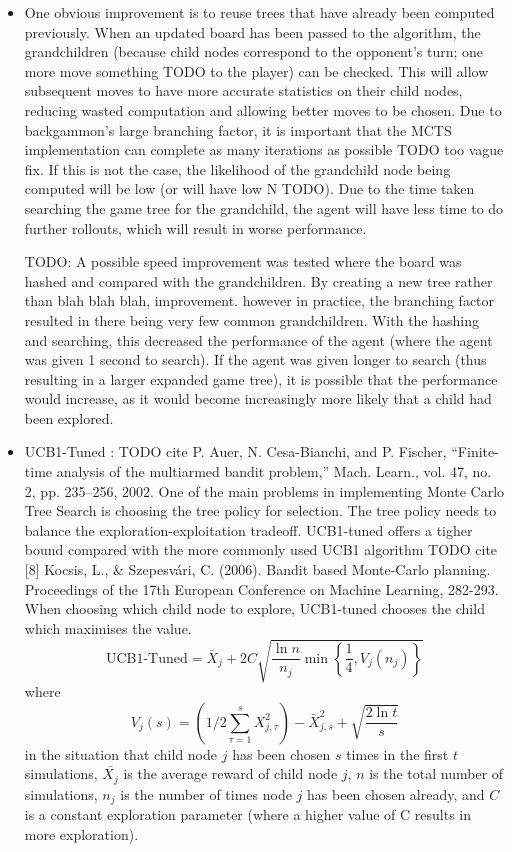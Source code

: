 \begin{itemize}
    \item One obvious improvement is to reuse trees that have already been computed previously. When an updated board has been passed to the algorithm, the grandchildren (because child nodes correspond to the opponent's turn; one more move something TODO to the player) can be checked. This will allow subsequent moves to have more accurate statistics on their child nodes, reducing wasted computation and allowing better moves to be chosen. Due to backgammon's large branching factor, it is important that the MCTS implementation can complete as many iterations as possible TODO too vague fix. If this is not the case, the likelihood of the grandchild node being computed will be low (or will have low N TODO). Due to the time taken searching the game tree for the grandchild, the agent will have less time to do further rollouts, which will result in worse performance.  

    TODO: A possible speed improvement was tested where the board was hashed and compared with the grandchildren. By creating a new tree rather than blah blah blah, improvement. however in practice, the branching factor resulted in there being very few common grandchildren. With the hashing and searching, this decreased the performance of the agent (where the agent was given 1 second to search). If the agent was given longer to search (thus resulting in a larger expanded game tree), it is possible that the performance would increase, as it would become increasingly more likely that a child had been explored.
    
    \item UCB1-Tuned \cite{6145622}: TODO cite  P. Auer, N. Cesa-Bianchi, and P. Fischer, “Finite-time analysis of the
    multiarmed bandit problem,” Mach. Learn., vol. 47, no. 2, pp. 235–256, 2002. One of the main problems in implementing Monte Carlo Tree Search is choosing the tree policy for selection. The tree policy needs to balance the exploration-exploitation tradeoff. UCB1-tuned offers a tigher bound compared with the more commonly used UCB1 algorithm TODO cite [8] Kocsis, L., \& Szepesvári, C. (2006). Bandit based Monte-Carlo planning. Proceedings of the 17th European Conference on Machine Learning, 282-293. When choosing which child node to explore, UCB1-tuned chooses the child which maximises the value.
    $$
    \mathrm{UCB} 1 \text{-Tuned}=\bar{X}_j+2C\sqrt{\frac{\ln n}{n_j} \min \left\{\frac{1}{4}, V_j\left(n_j\right)\right\}}
    $$ 
    where 
    $$
    V_j(s)=\left(1 / 2 \sum_{\tau=1}^s X_{j, \tau}^2\right)-\bar{X}_{j, s}^2+\sqrt{\frac{2 \ln t}{s}}
    $$ in the situation that child node $j$ has been chosen $s$ times in the first $t$ simulations, $\bar{X_j}$ is the average reward of child node $j$, $n$ is the total number of simulations, $n_j$ is the number of times node $j$ has been chosen already, and $C$ is a constant exploration parameter (where a higher value of C results in more exploration). 
    

\end{itemize}

